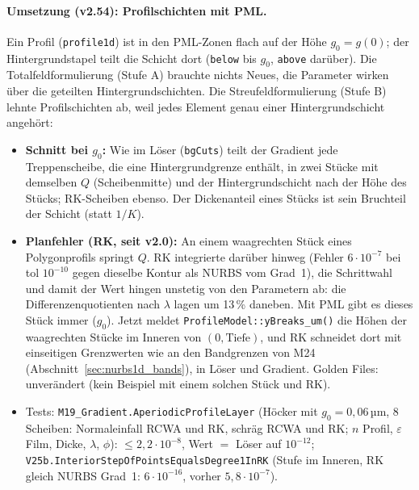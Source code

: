 \paragraph{Umsetzung (v2.54): Profilschichten mit PML.}
Ein Profil (\verb|profile1d|) ist in den PML-Zonen flach auf der Höhe $g_0=g(0)$; der Hintergrundstapel teilt die Schicht
dort (\verb|below| bis $g_0$, \verb|above| darüber). Die Totalfeldformulierung (Stufe A) brauchte nichts Neues, die Parameter
wirken über die geteilten Hintergrundschichten. Die Streufeldformulierung (Stufe B) lehnte Profilschichten ab, weil jedes
Element genau einer Hintergrundschicht angehört:
\begin{itemize}[nosep]
  \item \textbf{Schnitt bei $g_0$:} Wie im Löser (\verb|bgCuts|) teilt der Gradient jede Treppenscheibe, die eine
        Hintergrundgrenze enthält, in zwei Stücke mit demselben $Q$ (Scheibenmitte) und der Hintergrundschicht nach der
        Höhe des Stücks; RK-Scheiben ebenso. Der Dickenanteil eines Stücks ist sein Bruchteil der Schicht (statt $1/K$).
  \item \textbf{Planfehler (RK, seit v2.0):} An einem waagrechten Stück eines Polygonprofils springt $Q$. RK integrierte
        darüber hinweg (Fehler $6\cdot10^{-7}$ bei tol $10^{-10}$ gegen dieselbe Kontur als NURBS vom Grad~1), die Schrittwahl
        und damit der Wert hingen unstetig von den Parametern ab: die Differenzenquotienten nach $\lambda$ lagen um 13\,\%
        daneben. Mit PML gibt es dieses Stück immer ($g_0$). Jetzt meldet \verb|ProfileModel::yBreaks_um()| die Höhen
        der waagrechten Stücke im Inneren von $(0, \text{Tiefe})$, und RK schneidet dort mit einseitigen Grenzwerten wie an
        den Bandgrenzen von M24 (Abschnitt~\ref{sec:nurbs1d_bands}), in Löser und Gradient. Golden Files: unverändert (kein
        Beispiel mit einem solchen Stück und RK).
  \item Tests: \verb|M19_Gradient.AperiodicProfileLayer| (Höcker mit $g_0=0{,}06$\,µm, 8 Scheiben: Normaleinfall RCWA und RK,
        schräg RCWA und RK; $n$ Profil, $\varepsilon$ Film, Dicke, $\lambda$, $\phi$): $\le2{,}2\cdot10^{-8}$, Wert $=$ Löser auf
        $10^{-12}$; \verb|V25b.InteriorStepOfPointsEqualsDegree1InRK| (Stufe im Inneren, RK gleich NURBS Grad~1:
        $6\cdot10^{-16}$, vorher $5{,}8\cdot10^{-7}$).
\end{itemize}

